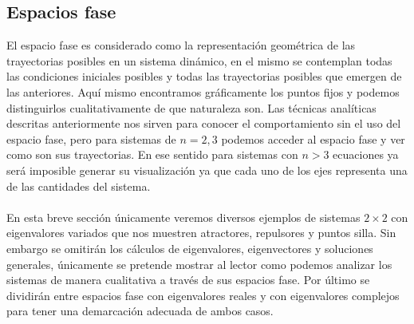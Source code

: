 \subsection{Espacios fase}\label{sec:Espacios fase}

El espacio fase es considerado como la representación geométrica de las trayectorias posibles en un sistema dinámico, en el mismo se contemplan todas las condiciones iniciales posibles y todas las trayectorias posibles que emergen de las anteriores. Aquí mismo encontramos gráficamente los puntos fijos y podemos distinguirlos cualitativamente de que naturaleza son. Las técnicas analíticas descritas anteriormente nos sirven para conocer el comportamiento sin el uso del espacio fase, pero para sistemas de $n=2,3$ podemos acceder al espacio fase y ver como son sus trayectorias. En ese sentido para sistemas con $n>3$ ecuaciones ya será imposible generar su visualización ya que cada uno de los ejes representa una de las cantidades del sistema. \\
\\
En esta breve sección únicamente veremos diversos ejemplos de sistemas $2\times 2$ con eigenvalores variados que nos muestren atractores, repulsores y puntos silla. Sin embargo se omitirán los cálculos de eigenvalores, eigenvectores y soluciones generales, únicamente se pretende mostrar al lector como podemos analizar los sistemas de manera cualitativa a través de sus espacios fase. Por último se dividirán entre espacios fase con eigenvalores reales y con eigenvalores complejos para tener una demarcación adecuada de ambos casos.
\newpage
